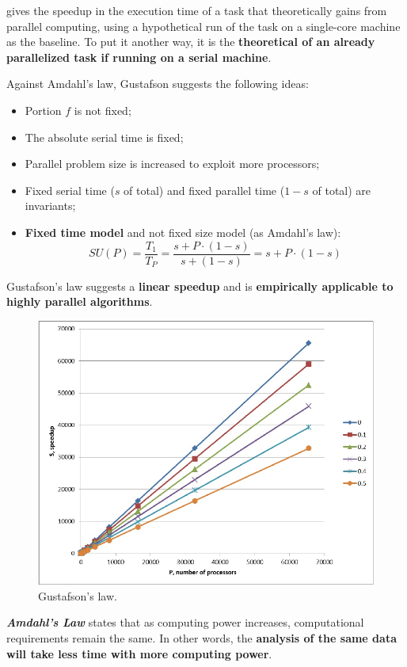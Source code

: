 \highspace
{} gives the speedup in the execution time of a task that theoretically gains from parallel computing, using a hypothetical run of the task on a single-core machine as the baseline. To put it another way, it is the \textbf{theoretical  of an already parallelized task if running on a serial machine}.

\highspace
Against Amdahl's law, Gustafson suggests the following ideas:
\begin{itemize}
    \item Portion $f$ is not fixed;
    \item The absolute serial time is fixed;
    \item Parallel problem size is increased to exploit more processors;
    \item Fixed serial time ($s$ of total) and fixed parallel time ($1-s$ of total) are invariants;
    \item \textbf{Fixed time model} and not fixed size model (as Amdahl's law):
    \begin{equation}
        SU\left(P\right) = \dfrac{T_{1}}{T_{P}} = \dfrac{s+P\cdot\left(1-s\right)}{s+\left(1-s\right)} = s + P\cdot\left(1-s\right)
    \end{equation}
\end{itemize}

\newpage

\noindent
Gustafson's law suggests a \textbf{linear speedup} and is \textbf{empirically applicable to highly parallel algorithms}.
\begin{figure}[!htp]
    \centering
    \includegraphics[width=.7\textwidth]{img/gustafson-law-1.pdf}
    \caption{Gustafson's law.}
\end{figure}

\noindent
\textbf{\emph{Amdahl's Law}} states that as computing power increases, computational requirements remain the same. In other words, the \textbf{analysis of the same data will take less time with more computing power}.

